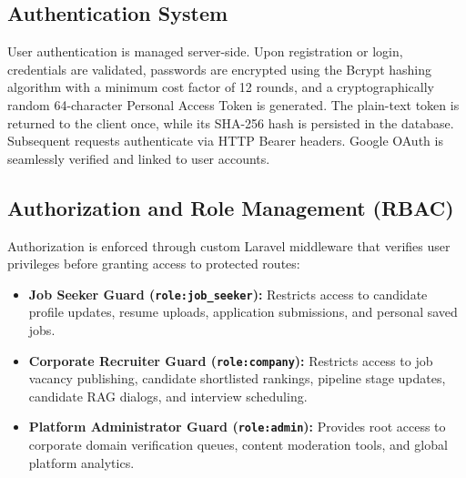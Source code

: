 \subsection{Authentication System}
User authentication is managed server-side. Upon registration or login, credentials are validated, passwords are encrypted using the Bcrypt hashing algorithm with a minimum cost factor of 12 rounds, and a cryptographically random 64-character Personal Access Token is generated. The plain-text token is returned to the client once, while its SHA-256 hash is persisted in the database. Subsequent requests authenticate via HTTP Bearer headers. Google OAuth is seamlessly verified and linked to user accounts.

\subsection{Authorization and Role Management (RBAC)}
Authorization is enforced through custom Laravel middleware that verifies user privileges before granting access to protected routes:
\begin{itemize}
    \item \textbf{Job Seeker Guard (\texttt{role:job\_seeker}):} Restricts access to candidate profile updates, resume uploads, application submissions, and personal saved jobs.
    \item \textbf{Corporate Recruiter Guard (\texttt{role:company}):} Restricts access to job vacancy publishing, candidate shortlisted rankings, pipeline stage updates, candidate RAG dialogs, and interview scheduling.
    \item \textbf{Platform Administrator Guard (\texttt{role:admin}):} Provides root access to corporate domain verification queues, content moderation tools, and global platform analytics.
\end{itemize}

